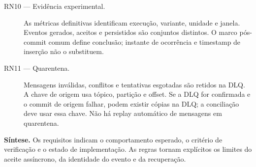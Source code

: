 \begin{description}
\item[RN10 --- Evidência experimental.] As métricas definitivas identificam execução, variante, unidade e janela. Eventos gerados, aceitos e persistidos são conjuntos distintos. O marco pós-commit comum define conclusão; instante de ocorrência e timestamp de inserção não o substituem.
\item[RN11 --- Quarentena.] Mensagens inválidas, conflitos e tentativas esgotadas são retidos na DLQ. A chave de origem usa tópico, partição e offset. Se a DLQ for confirmada e o commit de origem falhar, podem existir cópias na DLQ; a conciliação deve usar essa chave. Não há replay automático de mensagens em quarentena.
\end{description}
\textbf{Síntese.} Os requisitos indicam o comportamento esperado, o critério de verificação e o estado de implementação. As regras tornam explícitos os limites do aceite assíncrono, da identidade do evento e da recuperação.
